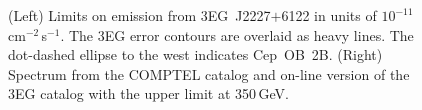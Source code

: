 \begin{figure}[p]
\caption{\label{FIG::OBSERVATIONS::J2227UL} (Left) Limits on 
emission from 3EG~J2227$+$6122 in units of
$10^{-11}$\,cm$^{-2}$\,s$^{-1}$. The 3EG error contours are overlaid
as heavy lines. The dot-dashed ellipse to the west indicates
Cep~OB~2B. (Right) Spectrum from the COMPTEL catalog
\citep{REF::SCHONFELDER::AAS2000} and on-line version of the 3EG catalog
with the upper limit at 350\,GeV.}
\end{figure}

